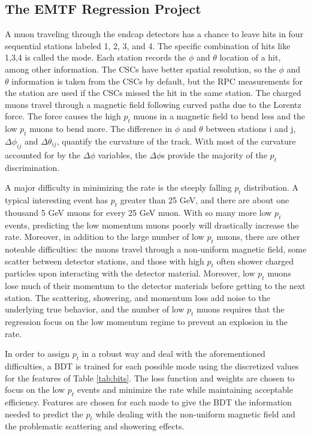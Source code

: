 \subsection{The EMTF Regression Project}

A muon traveling through the endcap detectors has a chance to leave hits in four sequential stations labeled 1, 2, 3, and 4. The specific combination of hits like 1,3,4 is called the mode. Each station records the $\phi$ and $\theta$ location of a hit, among other information. The CSCs have better spatial resolution, so the $\phi$ and $\theta$ information is taken from the CSCs by default, but the RPC measurements for the station are used if the CSCs missed the hit in the same station. The charged muons travel through a magnetic field following curved paths due to the Lorentz force. The force causes the high $p_t$ muons in a magnetic field to bend less and the low $p_t$ muons to bend more. The difference in $\phi$ and $\theta$ between stations i and j, $\Delta\phi_{ij}$ and $\Delta\theta_{ij}$, quantify the curvature of the track. With most of the curvature accounted for by the $\Delta\phi$ variables, the $\Delta\phi$s provide the majority of the $p_t$ discrimination.

A major difficulty in minimizing the rate is the steeply falling $p_t$ distribution. A typical interesting event has $p_t$ greater than 25 GeV, and there are about one thousand 5 GeV muons for every 25 GeV muon. With so many more low $p_t$ events, predicting the low momentum muons poorly will drastically increase the rate. Moreover, in addition to the large number of low $p_t$ muons, there are other noteable difficulties: the muons travel through a non-uniform magnetic field, some scatter between detector stations, and those with high $p_t$ often shower charged particles upon interacting with the detector material. Moreover, low $p_t$ muons lose much of their momentum to the detector materials before getting to the next station. The scattering, showering, and momentum loss add noise to the underlying true behavior, and the number of low $p_t$ muons requires that the regression focus on the low momentum regime to prevent an explosion in the rate.

In order to assign $p_t$ in a robust way and deal with the aforementioned difficulties, a BDT is trained for each possible mode using the discretized values for the features of Table \ref{tab:bits}. The loss function and weights are chosen to focus on the low $p_t$ events and minimize the rate while maintaining acceptable efficiency. Features are chosen for each mode to give the BDT the information needed to predict the $p_t$ while dealing with the non-uniform magnetic field and the problematic scattering and showering effects.

